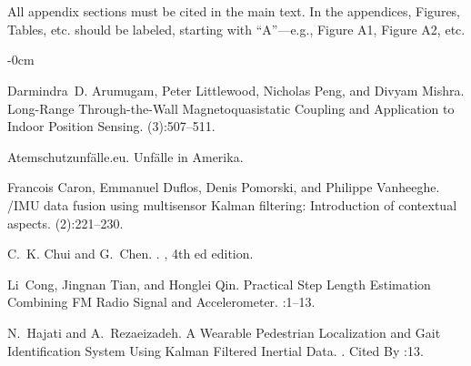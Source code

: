 \documentclass[engproc,conferenceproceedings,submit,pdftex,moreauthors]{Definitions/mdpi}
\begin{document}
\section[\appendixname~\thesection]{}
All appendix sections must be cited in the main text. In the appendices, Figures, Tables, etc. should be labeled, starting with ``A''---e.g., Figure A1, Figure A2, etc.

\begin{adjustwidth}{-\extralength}{0cm}



%

\begin{thebibliography}{999}
Darmindra~D. Arumugam, Peter Littlewood, Nicholas Peng, and Divyam Mishra.
\newblock Long-{{Range Through-the-Wall Magnetoquasistatic Coupling}} and
{{Application}} to {{Indoor Position Sensing}}.
(3):507--511.

Atemschutzunfälle.eu.
\newblock Unfälle in {{Amerika}}.

Francois Caron, Emmanuel Duflos, Denis Pomorski, and Philippe Vanheeghe.
/{{IMU}} data fusion using multisensor {{Kalman}} filtering:
Introduction of contextual aspects.
(2):221--230.

C.~K. Chui and G.~Chen.
.
, 4th ed edition.

Li~Cong, Jingnan Tian, and Honglei Qin.
\newblock Practical {{Step Length Estimation Combining FM Radio Signal}} and
{{Accelerometer}}.
:1--13.

N.~Hajati and A.~Rezaeizadeh.
\newblock A {{Wearable Pedestrian Localization}} and {{Gait Identification
		System Using Kalman Filtered Inertial Data}}.
.
\newblock Cited By :13.


\end{thebibliography}
\end{adjustwidth}
\end{document}
